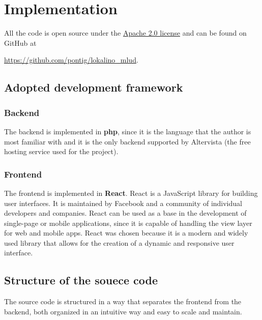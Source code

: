 \chapter{Implementation}

All the code is open source under the \href{https://www.apache.org/licenses/LICENSE-2.0}{Apache 2.0 license} and can be found on GitHub at

\begin{center}    
    \url{https://github.com/pontig/lokalino_mlud}.
\end{center}

\section{Adopted development framework}

\subsection*{Backend}

The backend is implemented in \textbf{php}, since it is the language that the author is most familiar with and it is the only backend supported by Altervista (the free hosting service used for the project).

\subsection*{Frontend}

The frontend is implemented in \textbf{React}. React is a JavaScript library for building user interfaces. It is maintained by Facebook and a community of individual developers and companies. React can be used as a base in the development of single-page or mobile applications, since it is capable of handling the view layer for web and mobile apps. React was chosen because it is a modern and widely used library that allows for the creation of a dynamic and responsive user interface.

\section{Structure of the souece code}
The source code is structured in a way that separates the frontend from the backend, both organized in an intuitive way and easy to scale and maintain.

